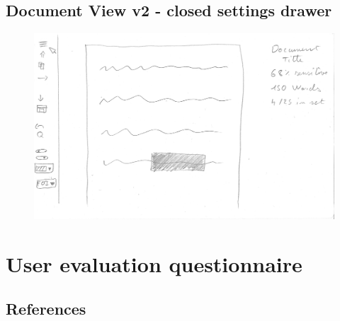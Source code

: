 \documentclass[\version]{l4proj}
\begin{document}
\begin{appendices}
    \section{Document View v2 - closed settings drawer}\label{fig:document view-closed-menu-wireframe}
    \begin{figure}[H]
        \centering
        \includegraphics[width=\linewidth]{images/wireframes/doc-view.jpg}
    \end{figure}
    \chapter{User evaluation questionnaire}\label{appendix:questionnaire}
    
\end{appendices}


\newpage


\section*{References}

\printbibliography[heading=none]

\vspace*{\fill}
\doclicenseThis%
\end{document}
